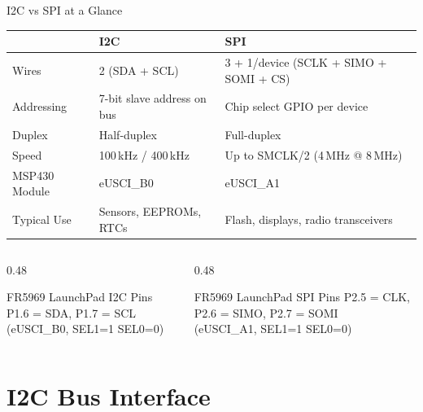 \documentclass[aspectratio=169, 10pt]{beamer}
\begin{document}
\begin{frame}{I2C vs SPI at a Glance}
\begin{table}
\centering
\small
\begin{tabular}{@{}lll@{}}
\toprule
& \textbf{I2C} & \textbf{SPI} \\
\midrule
Wires         & 2 (SDA + SCL) & 3 + 1/device (SCLK + SIMO + SOMI + CS) \\
Addressing    & 7-bit slave address on bus & Chip select GPIO per device \\
Duplex        & Half-duplex & Full-duplex \\
Speed         & 100\,kHz / 400\,kHz & Up to SMCLK/2 (4\,MHz @ 8\,MHz) \\
MSP430 Module & eUSCI\_B0 & eUSCI\_A1 \\
Typical Use   & Sensors, EEPROMs, RTCs & Flash, displays, radio transceivers \\
\bottomrule
\end{tabular}
\end{table}

\vspace{0.5em}
\begin{columns}[T]
\begin{column}{0.48\textwidth}
\begin{block}{FR5969 LaunchPad I2C Pins}
P1.6 = SDA, P1.7 = SCL\\
(eUSCI\_B0, SEL1=1 SEL0=0)
\end{block}
\end{column}
\begin{column}{0.48\textwidth}
\begin{block}{FR5969 LaunchPad SPI Pins}
P2.5 = CLK, P2.6 = SIMO, P2.7 = SOMI\\
(eUSCI\_A1, SEL1=1 SEL0=0)
\end{block}
\end{column}
\end{columns}
\end{frame}

\section{I2C Bus Interface}

\end{document}
